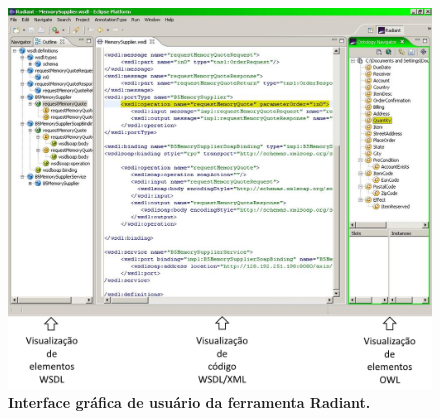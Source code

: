 \begin{figure}[h]
    \includegraphics[scale=0.5]{2-fundamentacao-teorica/imagens/radiant3.png}
    \centering
    \caption[Interface gráfica de usuário da ferramenta Radiant.]{\textbf{Interface gráfica de usuário da ferramenta Radiant.}}
    \label{fig:radiant}
\end{figure}